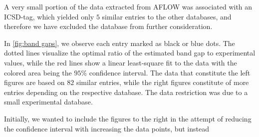 A very small portion of the data extracted from AFLOW was associated with an ICSD-tag, which yielded only $5$ similar entries to the other databases, and therefore we have excluded the database from further consideration.

In \autoref{fig:band gaps}, we observe each entry marked as black or blue dots. The dotted lines visualize the optimal ratio of the estimated band gap to experimental values, while the red lines show a linear least-square fit to the data with the colored area being the $95\%$ confidence interval. The data that constitute the left figures are based on $82$ similar entries, while the right figures constitute of more entries depending on the respective database. The data restriction was due to a small experimental database.

Initially, we wanted to include the figures to the right in the attempt of
reducing the confidence interval with increasing the data points, but instead


\clearpage
\begin{figure}[ht!]
    \centering
    \begin{subfigure}[t]{1\textwidth}
        \centering
        
        \caption{}
    \end{subfigure}%

    \begin{subfigure}[t]{1\textwidth}
        \centering
        
        \caption{}
    \end{subfigure}

    \begin{subfigure}[t]{1\textwidth}
        \centering
        
        \caption{}
    \end{subfigure}
\end{figure}

